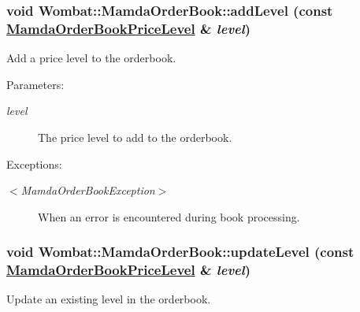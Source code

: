 \hypertarget{classWombat_1_1MamdaOrderBook_8e3034d510345db877f887bcf4e4cc10}{
\subsubsection[addLevel]{\setlength{\rightskip}{0pt plus 5cm}void Wombat::Mamda\-Order\-Book::add\-Level (const \hyperlink{classWombat_1_1MamdaOrderBookPriceLevel}{Mamda\-Order\-Book\-Price\-Level} \& {\em level})}}
\label{classWombat_1_1MamdaOrderBook_8e3034d510345db877f887bcf4e4cc10}


Add a price level to the orderbook. 

\begin{Desc}
\item[Parameters:]
\begin{description}
\item[{\em level}]The price level to add to the orderbook.\end{description}
\end{Desc}
\begin{Desc}
\item[Exceptions:]
\begin{description}
\item[{\em $<$Mamda\-Order\-Book\-Exception$>$}]When an error is encountered during book processing. \end{description}
\end{Desc}
\hypertarget{classWombat_1_1MamdaOrderBook_5dc1e1399aebce581e40c9a3127ca5e5}{
\subsubsection[updateLevel]{\setlength{\rightskip}{0pt plus 5cm}void Wombat::Mamda\-Order\-Book::update\-Level (const \hyperlink{classWombat_1_1MamdaOrderBookPriceLevel}{Mamda\-Order\-Book\-Price\-Level} \& {\em level})}}
\label{classWombat_1_1MamdaOrderBook_5dc1e1399aebce581e40c9a3127ca5e5}


Update an existing level in the orderbook. 

